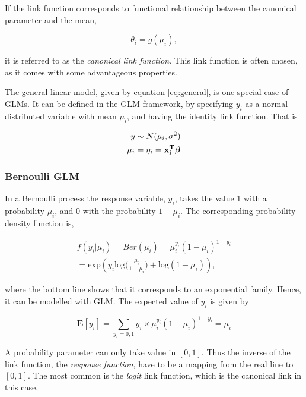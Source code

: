 If the link function corresponds to functional relationship between the canonical parameter and the mean,

\begin{equation}
\theta_i = g(\mu_i),
\end{equation}

it is referred to as the \textit{canonical link function}. This link function is often chosen, as it comes with some advantageous properties.

The general linear model, given by equation \ref{eq:general}, is one special case of GLMs. It can be defined in the GLM framework, by specifying $y_i$ as a normal distributed variable with mean $\mu_i$, and having the identity link function. That is

\begin{equation}
\begin{split}
y \sim N(\mu_i, \sigma^2) \\
\mu_i = \eta_i = \bf x_i^T \bm{ \beta}
\end{split}
\end{equation}

\subsubsection{Bernoulli GLM}

In a Bernoulli process the response variable, $y_i$, takes the value 1 with a probability $\mu_i$, and 0 with the probability $1-\mu_i$. The corresponding probability density function is,

\begin{equation}
\begin{split}
    f(y_i|\mu_i) = Ber(\mu_i) = \mu_i^{y_i}(1-\mu_i)^{1-y_i}\\
    = \text{exp} ( y_i  \text{log}\big(\frac{\mu_i}{1-\mu_i}\big) + \text{log}(1-\mu_i)),
\end{split}
\end{equation}

where the bottom line shows that it corresponds to an exponential family. Hence, it can be modelled with GLM. The expected value of $y_i$ is given by

\begin{equation}
\mathbf{E} [y_i] = \sum_{y_i = 0,1} y_i \times \mu_i^{y_i}(1-\mu_i)^{1-y_i} = \mu_i
\end{equation}

A probability parameter can only take value in $[0,1]$. Thus the inverse of the link function, the \textit{response function}, have to be a mapping from the real line to $[0,1]$. The most common is the \textit{logit} link function, which is the canonical link in this case,

